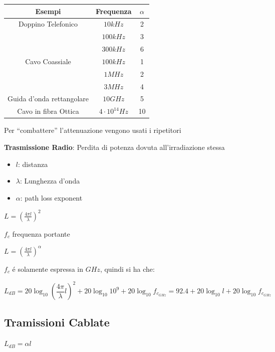 \documentclass{article}
\begin{document}
\begin{center}
    \begin{tabular}{||c|c|c||}
        \hline
        Esempi & Frequenza & \( \alpha \)     \\
        \hline \hline
        Doppino Telefonico & \( 10 kHz \) & 2 \\
                           & \( 100 kHz\) & 3 \\
                           & \( 300 kHz\) & 6 \\
        \hline
        Cavo Coassiale     & \( 100 kHz\) & 1 \\
                           & \( 1 MHz\) & 2 \\
                           & \( 3 MHz\) & 4 \\
        \hline
        Guida d'onda rettangolare     & \( 10 GHz\) & 5 \\

        \hline
        Cavo in fibra Ottica & \( 4\cdot 10^{14} Hz\) & 10 \\

        \hline
    \end{tabular}
\end{center}

Per ``combattere'' l'attenuazione vengono usati i ripetitori

\textbf{Trasmissione Radio}: Perdita di potenza dovuta all'irradiazione stessa

\begin{itemize}
    \item $l$: distanza
    \item $\lambda$: Lunghezza d'onda
    \item $\alpha$: path loss exponent
\end{itemize}


$ L = {(\frac{4\pi l}{\lambda})}^2 $


 \quad
$f_c$ frequenza portante

$ L = {(\frac{4\pi l}{\lambda})}^\alpha $

$f_c$ \'e solamente espressa in $GHz$, quindi si ha che:

\[
    L_{dB} = 20\log_{10} {\left(\frac{4\pi}{\lambda}l\right)}^2 + 20\log_{10} 10^9 + 20\log_{10} f_{c_{GHz}} = 92.4 + 20\log_{10} l + 20\log_{10} f_{c_{GHz}}
\]

\subsection{Tramissioni Cablate}
$L_{dB} = \alpha l$
\end{document}
